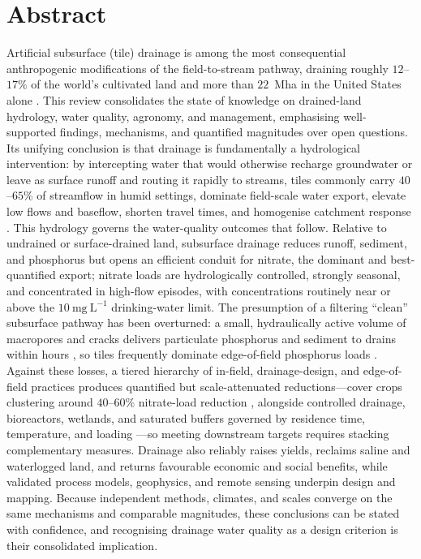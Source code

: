 \documentclass[11pt]{article}
\begin{document}
\section*{Abstract}

Artificial subsurface (tile) drainage is among the most consequential
anthropogenic modifications of the field-to-stream pathway, draining roughly
$12$--$17\%$ of the world's cultivated land and more than $22$~Mha in the
United States alone \parencite{Valipour2014,Valayamkunnath2020}. This review consolidates the state of knowledge on
drained-land hydrology, water quality, agronomy, and management, emphasising
well-supported findings, mechanisms, and quantified magnitudes over open
questions. Its unifying conclusion is that drainage is fundamentally a
hydrological intervention: by intercepting water that would otherwise recharge
groundwater or leave as surface runoff and routing it rapidly to streams, tiles
commonly carry $40$--$65\%$ of streamflow in humid settings, dominate field-scale
water export, elevate low flows and baseflow, shorten travel times, and
homogenise catchment response \parencite{King2014,Schilling2019}. This hydrology governs the water-quality
outcomes that follow. Relative to undrained or surface-drained land, subsurface
drainage reduces runoff, sediment, and phosphorus but opens an efficient conduit
for nitrate, the dominant and best-quantified export; nitrate loads are
hydrologically controlled, strongly seasonal, and concentrated in high-flow
episodes, with concentrations routinely near or above the $10~\mathrm{mg~L^{-1}}$
drinking-water limit. The presumption of a filtering ``clean'' subsurface pathway
has been overturned: a small, hydraulically active volume of macropores and
cracks delivers particulate phosphorus and sediment to drains within hours \parencite{Pease2018}, so
tiles frequently dominate edge-of-field phosphorus loads \parencite{Pease2018,Sharpley1995}. Against these losses,
a tiered hierarchy of in-field, drainage-design, and edge-of-field practices
produces quantified but scale-attenuated reductions---cover crops clustering
around $40$--$60\%$ nitrate-load reduction \parencite{Malone2018,Malone2014b,Malone2023}, alongside controlled drainage,
bioreactors, wetlands, and saturated buffers governed by residence time,
temperature, and loading \parencite{Christianson2013,Jaynes2008}---so meeting downstream targets requires stacking
complementary measures. Drainage also reliably raises yields, reclaims saline
and waterlogged land, and returns favourable economic and social benefits, while
validated process models, geophysics, and remote sensing underpin design and
mapping. Because independent methods, climates, and scales converge on the same
mechanisms and comparable magnitudes, these conclusions can be stated with
confidence, and recognising drainage water quality as a design criterion is
their consolidated implication.

\printbibliography
\end{document}

